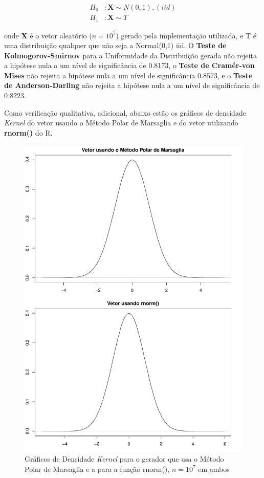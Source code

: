 \documentclass[
	article,			%
	12pt,				%
	twoside,			%
	a4paper,			%
	english,			%
	brazil,				%
	]{abntex2}
\begin{document}
    \begin{align*}
        H_0 & : \mathbf{X} \sim N(0,1), (iid)\\
        H_1 & : \mathbf{X} \sim T
    \end{align*}
    
    onde \textbf{X} é o vetor aleatório  ($n = 10^7$) gerado pela implementação utilizada, e T é uma distribuição qualquer que não seja a Normal(0,1) iid. O \textbf{Teste de Kolmogorov-Smirnov} para a Uniformidade da Distribuição gerada não rejeita a hipótese nula a um nível de significância de 0.8173, o \textbf{Teste de Cramér-von Mises} não rejeita a hipótese nula a um nível de significância 0.8573, e o \textbf{Teste de Anderson-Darling} não rejeita a hipótese nula a um nível de significância de 0.8223. 
    
    Como verificação qualitativa, adicional, abaixo estão os gráficos de densidade \textit{Kernel} do vetor usando o Método Polar de Marsaglia e do vetor utilizando \textbf{rnorm()} do R. 
    
    \begin{figure}[h]
        \centering
        \includegraphics[scale=0.25]{rnorm_polar}
        \caption{Gráficos de Densidade \textit{Kernel} para o gerador que usa o Método Polar de Marsaglia e a para a função rnorm(), $n = 10^7$ em ambos}
        \label{fig:rnorm_polar}
    \end{figure}
\end{document}
